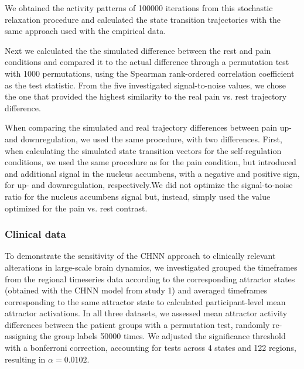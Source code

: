 \documentclass{article}
\begin{document}
We obtained the activity patterns of 100000 iterations from this stochastic relaxation procedure and calculated the state transition trajectories with the same approach used with the empirical data.

Next we calculated the the simulated difference between the rest and pain conditions and compared it to the actual difference through a permutation test with 1000 permutations, using the Spearman rank-ordered correlation coefficient as the test statistic.
From the five investigated signal-to-noise values, we chose the one that provided the highest similarity to the real pain vs. rest trajectory difference.

When comparing the simulated and real trajectory differences between pain up- and downregulation, we used the same procedure, with two differences. First, when calculating the simulated state transition vectors for the self-regulation conditions, we used the same procedure as for the pain condition, but introduced and additional signal in the nucleus accumbens, with a negative and positive sign, for  up- and downregulation, respectively.We did not optimize the signal-to-noise ratio for the nucleus accumbens signal but, instead, simply used the value optimized for the pain vs. rest contrast.

\subsubsection{Clinical data}\label{Clinical data}

To demonstrate the sensitivity of the CHNN approach to clinically relevant alterations in large-scale brain dynamics, we investigated grouped the timeframes from the regional timeseries data according to the corresponding attractor states (obtained with the CHNN model from study 1) and averaged timeframes corresponding to the same attractor state to calculated participant-level mean attractor activations.
In all three datasets, we assessed mean attractor activity differences between the patient groups with a permutation test, randomly re-assigning the group labels 50000 times.
We adjusted the significance threshold with a bonferroni correction, accounting for tests across 4 states and 122 regions, resulting in $\alpha = 0.0102$.
\end{document}

